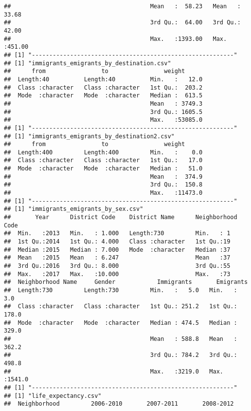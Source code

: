 \documentclass[
]{article}
\begin{document}
\begin{verbatim}
##                                        Mean   :  58.23   Mean   : 33.68  
##                                        3rd Qu.:  64.00   3rd Qu.: 42.00  
##                                        Max.   :1393.00   Max.   :451.00  
## [1] "----------------------------------------------------------"
## [1] "immigrants_emigrants_by_destination.csv"
##      from                to                weight       
##  Length:40          Length:40          Min.   :   12.0  
##  Class :character   Class :character   1st Qu.:  203.2  
##  Mode  :character   Mode  :character   Median :  613.5  
##                                        Mean   : 3749.3  
##                                        3rd Qu.: 1605.5  
##                                        Max.   :53085.0  
## [1] "----------------------------------------------------------"
## [1] "immigrants_emigrants_by_destination2.csv"
##      from                to                weight       
##  Length:400         Length:400         Min.   :    0.0  
##  Class :character   Class :character   1st Qu.:   17.0  
##  Mode  :character   Mode  :character   Median :   51.0  
##                                        Mean   :  374.9  
##                                        3rd Qu.:  150.8  
##                                        Max.   :11473.0  
## [1] "----------------------------------------------------------"
## [1] "immigrants_emigrants_by_sex.csv"
##       Year      District Code    District Name      Neighborhood Code
##  Min.   :2013   Min.   : 1.000   Length:730         Min.   : 1       
##  1st Qu.:2014   1st Qu.: 4.000   Class :character   1st Qu.:19       
##  Median :2015   Median : 7.000   Mode  :character   Median :37       
##  Mean   :2015   Mean   : 6.247                      Mean   :37       
##  3rd Qu.:2016   3rd Qu.: 8.000                      3rd Qu.:55       
##  Max.   :2017   Max.   :10.000                      Max.   :73       
##  Neighborhood Name     Gender            Immigrants       Emigrants     
##  Length:730         Length:730         Min.   :   5.0   Min.   :   3.0  
##  Class :character   Class :character   1st Qu.: 251.2   1st Qu.: 178.0  
##  Mode  :character   Mode  :character   Median : 474.5   Median : 329.0  
##                                        Mean   : 588.8   Mean   : 362.2  
##                                        3rd Qu.: 784.2   3rd Qu.: 498.8  
##                                        Max.   :3219.0   Max.   :1541.0  
## [1] "----------------------------------------------------------"
## [1] "life_expectancy.csv"
##  Neighborhood         2006-2010       2007-2011       2008-2012    

\end{verbatim}
\end{document}
